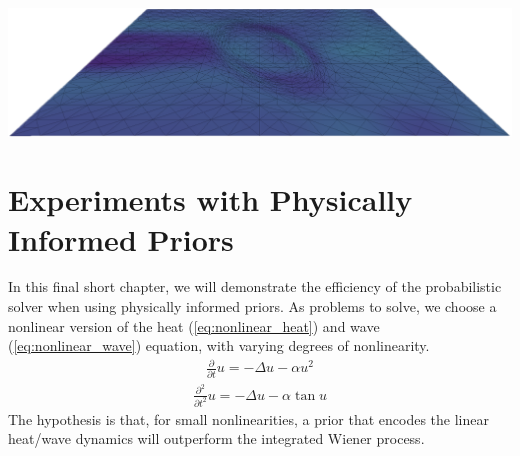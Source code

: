 \begin{center}
    \includegraphics[width=\columnwidth]{../images/bell_wave_3.png}\vspace*{3mm}
    \label{fig:bell_wave}
\end{center}

\section{Experiments with Physically Informed Priors}
In this final short chapter, we will demonstrate the efficiency of the probabilistic solver when using physically informed priors. As problems to solve, we choose a nonlinear version of the heat (\ref{eq:nonlinear_heat}) and wave (\ref{eq:nonlinear_wave}) equation, with varying degrees of nonlinearity. 
\begin{align}
    \frac{\partial}{\partial t}u = -\Delta u - \alpha u^2\label{eq:nonlinear_heat}
\end{align}
\begin{align}
    \frac{\partial^2}{\partial t^2}u = -\Delta u - \alpha\tan u\label{eq:nonlinear_wave}
\end{align}
The hypothesis is that, for small nonlinearities, a prior that encodes the linear heat/wave dynamics will outperform the integrated Wiener process. 


